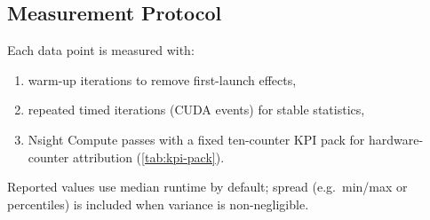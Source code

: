 \subsection{Measurement Protocol}

Each data point is measured with:

\begin{enumerate}
  \item warm-up iterations to remove first-launch effects,
  \item repeated timed iterations (CUDA events) for stable statistics,
  \item Nsight Compute passes with a fixed ten-counter KPI pack for
  hardware-counter attribution (\cref{tab:kpi-pack}).
\end{enumerate}

Reported values use median runtime by default; spread (e.g.\ min/max or
percentiles) is included when variance is non-negligible.
